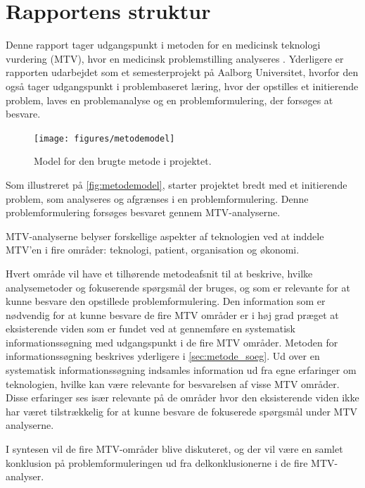 \chapter{Rapportens struktur} \label{metode}
Denne rapport tager udgangspunkt i metoden for en medicinsk teknologi vurdering (MTV), hvor en medicinsk problemstilling analyseres \citep{mtvhaandbog}. Yderligere er rapporten udarbejdet som et semesterprojekt på Aalborg Universitet, hvorfor den også tager udgangspunkt i problembaseret læring, hvor der opstilles et initierende problem, laves en problemanalyse og en problemformulering, der forsøges at besvare. 


\begin{figure}[H]
	\centering
	\texttt{[image: figures/metodemodel]}
	\caption{Model for den brugte metode i projektet.}
	\label{fig:metodemodel}
\end{figure}

\noindent
Som illustreret på \autoref{fig:metodemodel}, starter projektet bredt med et initierende problem, som analyseres og afgrænses i en problemformulering. Denne problemformulering forsøges besvaret gennem MTV-analyserne. 

MTV-analyserne belyser forskellige aspekter af teknologien ved at inddele MTV'en i fire områder: teknologi, patient, organisation og økonomi. %

Hvert område vil have et tilhørende metodeafsnit til at beskrive, hvilke analysemetoder og fokuserende spørgsmål der bruges, og som er relevante for at kunne besvare den opstillede problemformulering. Den information som er nødvendig for at kunne besvare de fire MTV områder er i høj grad præget at eksisterende viden som er fundet ved at gennemføre en systematisk informationssøgning med udgangspunkt i de fire MTV områder. Metoden for informationssøgning beskrives yderligere i \autoref{sec:metode_soeg}. Ud over en systematisk informationssøgning indsamles information ud fra egne erfaringer om teknologien, hvilke kan være relevante for besvarelsen af visse MTV områder. Disse erfaringer ses især relevante på de områder hvor den eksisterende viden ikke har været tilstrækkelig for at kunne besvare de fokuserede spørgsmål under MTV analyserne.

I syntesen vil de fire MTV-områder blive diskuteret, og der vil være en samlet konklusion på problemformuleringen ud fra delkonklusionerne i de fire MTV-analyser. 

